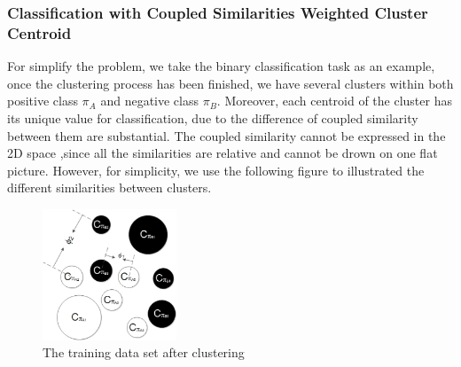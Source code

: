 \documentclass{article}
\numberwithin{equation}{section}
\begin{document}
\subsubsection{Classification with Coupled Similarities Weighted Cluster Centroid}
For simplify the problem, we take the binary classification task as an example, once the clustering process has been finished, we have several clusters within both positive class $\pi_{A}$ and negative class $\pi_{B}$. Moreover, each centroid of the cluster has its unique value for classification, due to the difference of coupled similarity between them are substantial. The coupled similarity cannot be expressed in the 2D space ,since all the similarities are relative and cannot be drown on one flat picture. However, for simplicity, we use the following figure to illustrated the different similarities between clusters.

\begin{figure}
 \centering
  \includegraphics[width=4cm]{cluster.eps}
 \caption{The training data set after clustering}
 \label{cluster}
\end{figure}
\end{document}
